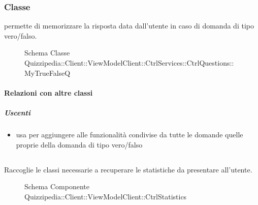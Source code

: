 \subsubsection{Classe }
permette di memorizzare la risposta data dall'utente in caso di domanda di tipo vero/falso.
\begin{figure}[H]
\centering
\noindent{}
\caption[Schema Classe MyTrueFalseQ]{Schema Classe Quizzipedia::Client::ViewModelClient::CtrlServices::CtrlQuestions::MyTrueFalseQ}
\end{figure}
\paragraph{Relazioni con altre classi}
\subparagraph{Uscenti}
\begin{itemize}
\item usa  per aggiungere alle funzionalità condivise da tutte le domande quelle proprie della domanda di tipo vero/falso
\end{itemize}
\subsection{}
Raccoglie le classi necessarie a recuperare le statistiche da presentare all'utente.
\begin{figure}[H]
\centering
\noindent{}
\caption[Schema Componente Quizzipedia::Client::ViewModelClient::CtrlStatistics]{Schema Componente Quizzipedia::Client::ViewModelClient::CtrlStatistics}
\end{figure}
